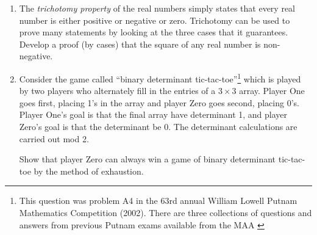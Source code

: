 \begin{enumerate}
\item The \emph{trichotomy property} of the real 
numbers simply states that every real number is either positive or negative 
or zero.  Trichotomy can be used to prove many statements by looking at the
three cases that it guarantees.  Develop a proof (by cases) that the square of
any real number is non-negative.


\item Consider the game called ``binary determinant tic-tac-toe''\footnote{ %
This question was problem A4 in the 63rd annual %
William Lowell Putnam Mathematics Competition (2002).  %
There are three collections of questions %
and answers  from previous Putnam exams available from the MAA %
\cite{putnam1,putnam2,putnam3}%
}
which is played by two players who alternately fill in the entries of a 
$3 \times 3$ array.  Player One goes first, placing 1's in the array and 
player Zero goes second, placing 0's.  Player One's goal is that the 
final array have determinant 1, and player Zero's goal is that the 
determinant be 0.  The determinant calculations are carried out mod 2.

Show that player Zero can always win a game of binary determinant tic-tac-toe
by the method of exhaustion.

\end{enumerate}
